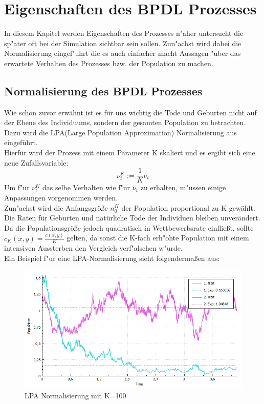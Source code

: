 \documentclass[11pt, a4paper, german]{article}
\theoremstyle{plain}
\begin{document}
\clearpage
\section{Eigenschaften des BPDL Prozesses}
In diesem Kapitel werden Eigenschaften des Prozesses n"aher untersucht die sp"ater oft bei der Simulation sichtbar sein sollen. Zun"achst wird dabei die Normalisierung eingef"uhrt die es auch einfacher macht Aussagen "uber das erwartete Verhalten des Prozesses bzw. der Population zu machen. 

\subsection{Normalisierung des BPDL Prozesses}
	Wie schon zuvor erwähnt ist es für uns wichtig die Tode und Geburten nicht auf der Ebene des Individuums, sondern der gesamten Population zu betrachten. Dazu wird die LPA(Large Population Approximation) Normalisierung aus \cite{fournier2004microscopic} eingeführt.\\
	Hierfür wird der Prozess mit einem Parameter K skaliert und es ergibt sich eine neue Zufallsvariable:
	\[ \nu_t^K := \frac{1}{K} \nu_t \]
	Um f"ur $ \nu_t^K $ das selbe Verhalten wie f"ur $ \nu_t $ zu erhalten, m"ussen einige Anpassungen vorgenommen werden.\\
	Zun"achst wird die Anfangsgröße $ n_0^K $ der Population proportional zu K gewählt.
	Die Raten für Geburten und natürliche Tode der Individuen bleiben unverändert. Da die Populationsgröße jedoch quadratisch in Wettbewerbsrate einfließt, sollte $ c_K(x,y) = \frac{c(x,y)}{K} $ gelten, da sonst die K-fach erh"ohte Population mit einem intensiven Aussterben den Vergleich verf"alschen w"urde. \\
	Ein Beispiel f"ur eine LPA-Normalisierung sieht folgendermaßen aus:
	\begin{figure}[H]
		\centering
		\includegraphics[width=1\linewidth]{./Pictures/LPANormalisierungK100}
		\caption[LPAK100]{LPA Normalisierung mit K=100}
		\label{LPA Normalisierung K=100}
	\end{figure}
\end{document}
